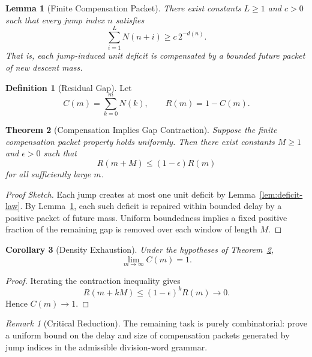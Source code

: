 \documentclass[12pt, oneside]{article}
\numberwithin{equation}{section}
\theoremstyle{definition}
\newtheorem{definition}{Definition}[section]
\theoremstyle{plain}
\newtheorem{theorem}{Theorem}[section]
\newtheorem{lemma}[theorem]{Lemma}
\newtheorem{corollary}[theorem]{Corollary}
\theoremstyle{remark}
\newtheorem*{remark}{Remark}
\begin{document}
\begin{lemma}[Finite Compensation Packet]
\label{lem:packet}
There exist constants $L\ge1$ and $c>0$ such that every jump index $n$
satisfies
\[
\sum_{i=1}^{L} N(n+i)\ge c\,2^{-d(n)}.
\]
That is, each jump-induced unit deficit is compensated by a bounded
future packet of new descent mass.
\end{lemma}


\begin{definition}[Residual Gap]
Let
\[
C(m)=\sum_{k=0}^{m}N(k),
\qquad
R(m)=1-C(m).
\]
\end{definition}


\begin{theorem}[Compensation Implies Gap Contraction]
\label{thm:gap-contraction}
Suppose the finite compensation packet property holds uniformly.
Then there exist constants $M\ge1$ and $\epsilon>0$ such that
\[
R(m+M)\le (1-\epsilon)R(m)
\]
for all sufficiently large $m$.
\end{theorem}

\begin{proof}[Proof Sketch]
Each jump creates at most one unit deficit by
Lemma~\ref{lem:deficit-law}. By Lemma~\ref{lem:packet}, each such deficit
is repaired within bounded delay by a positive packet of future mass.
Uniform boundedness implies a fixed positive fraction of the remaining
gap is removed over each window of length $M$.
\end{proof}


\begin{corollary}[Density Exhaustion]
\label{cor:density-exhaustion}
Under the hypotheses of Theorem~\ref{thm:gap-contraction},
\[
\lim_{m\to\infty} C(m)=1.
\]
\end{corollary}

\begin{proof}
Iterating the contraction inequality gives
\[
R(m+kM)\le (1-\epsilon)^kR(m)\to0.
\]
Hence $C(m)\to1$.
\end{proof}


\begin{remark}[Critical Reduction]
The remaining task is purely combinatorial: prove a uniform bound on the
delay and size of compensation packets generated by jump indices in the
admissible division-word grammar.
\end{remark}
\end{document}
